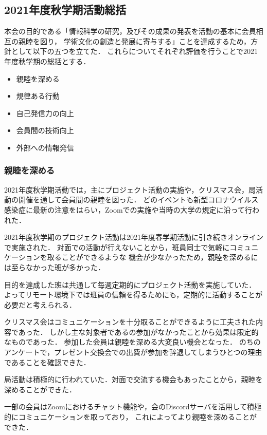 \subsection*{2021年度秋学期活動総括}
 

本会の目的である「情報科学の研究，及びその成果の発表を活動の基本に会員相互の親睦を図り，
学術文化の創造と発展に寄与する」ことを達成するため，方針として以下の五つを立てた．
これらについてそれぞれ評価を行うことで2021年度秋学期の総括とする．

\begin{itemize}
    \item 親睦を深める
    \item 規律ある行動
    \item 自己発信力の向上
    \item 会員間の技術向上
    \item 外部への情報発信
\end{itemize}

\subsubsection*{親睦を深める}
    2021年度秋学期活動では，主にプロジェクト活動の実施や，クリスマス会，局活動の開催を通して会員間の親睦を図った．
    どのイベントも新型コロナウイルス感染症に最新の注意をはらい，Zoomでの実施や当時の大学の規定に沿って行われた．

    2021年度秋学期のプロジェクト活動は2021年度春学期活動に引き続きオンラインで実施された．
    対面での活動が行えないことから，班員同士で気軽にコミュニケーションを取ることができるような
    機会が少なかったため，親睦を深めるには至らなかった班が多かった．
    
    目的を達成した班は共通して毎週定期的にプロジェクト活動を実施していた．
    よってリモート環境下では班員の信頼を得るためにも，定期的に活動することが必要だと考えられる．

    クリスマス会はコミュニケーションを十分取ることができるように工夫された内容であった．
    しかし主な対象者である\firstGrade{}の参加がなかったことから効果は限定的なものであった．
    参加した会員は親睦を深める大変良い機会となった．
    のちのアンケートで，プレゼント交換会での出費が参加を辞退してしまうひとつの理由であることを確認できた．
    
    局活動は積極的に行われていた．対面で交流する機会もあったことから，親睦を深めることができた．

    一部の会員はZoomにおけるチャット機能や，会のDiscordサーバを活用して積極的にコミュニケーションを取っており，
    これによってより親睦を深めることができた．
    
